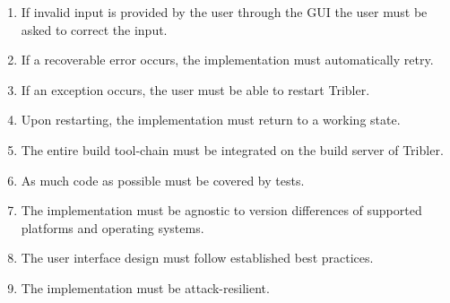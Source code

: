 \begin{enumerate}[label=B\arabic*.,ref=B\arabic*]
	\item If invalid input is provided by the user through the GUI the user must be asked to correct the input.
	\item If a recoverable error occurs, the implementation must automatically retry.
	\item If an exception occurs, the user must be able to restart Tribler.
	\item Upon restarting, the implementation must return to a working state.
	\item The entire build tool-chain must be integrated on the build server of Tribler. %
	\item As much code as possible must be covered by tests.
	\item The implementation must be agnostic to version differences of supported platforms and operating systems.
	\item The user interface design must follow established best practices.%
	\item The implementation must be attack-resilient.

\end{enumerate}


